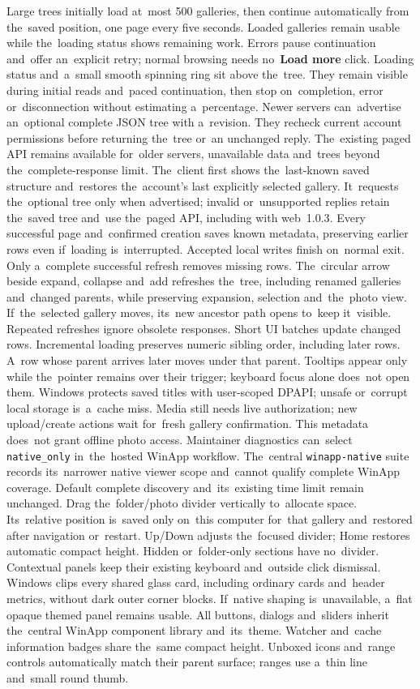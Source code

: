 \documentclass[11pt,a4paper]{article}
\newcommand{\ui}[1]{\textbf{#1}}
\begin{document}
Large trees initially load at~most 500 galleries, then continue automatically
from the~saved position, one page every five seconds. Loaded galleries remain
usable while the~loading status shows remaining work. Errors pause continuation
and~offer an~explicit retry; normal browsing needs no~\ui{Load more} click.
Loading status and~a~small smooth spinning ring sit above the~tree. They remain
visible during initial reads and~paced continuation, then stop on~completion,
error or~disconnection without estimating a~percentage.
Newer servers can~advertise an~optional complete JSON tree with a~revision.
They recheck current account permissions before returning the~tree or~an
unchanged reply. The~existing paged API remains available for~older servers,
unavailable data and~trees beyond the~complete-response limit.
The~client first shows the~last-known saved structure and~restores
the~account's last explicitly selected gallery. It~requests the~optional tree
only when advertised; invalid or~unsupported replies retain the~saved tree
and~use the~paged API, including with web~1.0.3. Every successful page
and~confirmed creation saves known metadata, preserving earlier rows even
if~loading is~interrupted. Accepted local writes finish on~normal exit.
Only a~complete successful refresh removes missing rows. The~circular arrow
beside expand, collapse and~add refreshes the~tree, including renamed galleries
and~changed parents, while preserving expansion, selection and~the~photo view.
If~the~selected gallery moves, its~new ancestor path opens to~keep it~visible.
Repeated refreshes ignore obsolete responses. Short UI batches update
changed rows. Incremental loading preserves numeric sibling order, including
later rows. A~row whose parent arrives later moves under that parent. Tooltips appear only
while the~pointer remains over their trigger; keyboard focus alone does~not
open them. Windows protects saved titles
with user-scoped DPAPI; unsafe
or~corrupt local storage is~a~cache miss. Media still needs live authorization;
new upload/create actions wait for~fresh gallery confirmation. This metadata
does~not grant offline photo access.
Maintainer diagnostics can~select \texttt{native\_only} in~the~hosted WinApp
workflow. The~central \texttt{winapp-native} suite records its~narrower native
viewer scope and~cannot qualify complete WinApp coverage. Default complete
discovery and~its~existing time limit remain unchanged.
Drag the~folder/photo divider vertically to~allocate space. Its~relative position
is~saved only on~this computer for~that gallery and~restored after navigation
or~restart. Up/Down adjusts the~focused divider; Home restores automatic compact
height. Hidden or~folder-only sections have no~divider.
Contextual panels keep their existing keyboard and~outside click dismissal.
Windows clips every shared glass card, including ordinary cards and~header
metrics, without dark outer corner blocks. If~native shaping is~unavailable,
a~flat opaque themed panel remains usable. All buttons, dialogs and~sliders
inherit the~central WinApp component library and~its~theme.
Watcher and~cache information badges share the~same compact height. Unboxed
icons and~range controls automatically match their parent surface; ranges use
a~thin line and~small round thumb.
\end{document}
